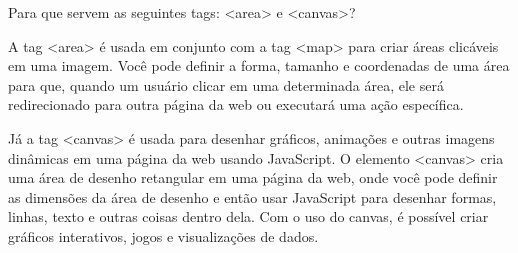 Para que servem as seguintes tags:
<area> e <canvas>?

A tag <area> é usada em conjunto com a tag <map> para criar áreas clicáveis em uma imagem. 
Você pode definir a forma, tamanho e coordenadas de uma área para que, 
quando um usuário clicar em uma determinada área,
ele será redirecionado para outra página da web ou executará uma ação específica.

Já a tag <canvas> é usada para desenhar gráficos, animações e outras imagens dinâmicas em uma página da web usando JavaScript.
O elemento <canvas> cria uma área de desenho retangular em uma página da web, 
onde você pode definir as dimensões da área de desenho e então usar JavaScript para desenhar formas, linhas, texto e outras coisas dentro dela.
Com o uso do canvas, é possível criar gráficos interativos, jogos e visualizações de dados.